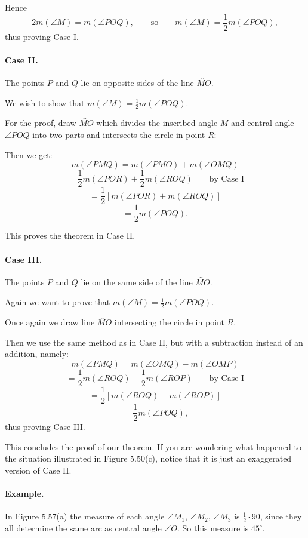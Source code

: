 \documentclass[12pt]{book} %
\begin{document}
Hence
\[
2m(\angle M)=m(\angle POQ), \qquad \text{so} \qquad m(\angle M)=\frac12 m(\angle POQ),
\]
thus proving Case I.

\paragraph{Case II.}
The points $P$ and $Q$ lie on opposite sides of the line $\overleftrightarrow{MO}$.


We wish to show that $m(\angle M)=\frac12 m(\angle POQ)$.

For the proof, draw $\overleftrightarrow{MO}$ which divides the inscribed angle $M$ and
central angle $\angle POQ$ into two parts and intersects the circle in point $R$:


Then we get:
\[
m(\angle PMQ)=m(\angle PMO)+m(\angle OMQ)
\]
\[
=\frac12 m(\angle POR)+\frac12 m(\angle ROQ)
\qquad \text{by Case I}
\]
\[
=\frac12[m(\angle POR)+m(\angle ROQ)]
\]
\[
=\frac12 m(\angle POQ).
\]

This proves the theorem in Case II.

\paragraph{Case III.}
The points $P$ and $Q$ lie on the same side of the line $\overleftrightarrow{MO}$.


Again we want to prove that $m(\angle M)=\frac12 m(\angle POQ)$.

Once again we draw line $\overleftrightarrow{MO}$ intersecting the circle in point $R$.


Then we use the same method as in Case II, but with a subtraction instead of an addition, namely:
\[
m(\angle PMQ)=m(\angle OMQ)-m(\angle OMP)
\]
\[
=\frac12 m(\angle ROQ)-\frac12 m(\angle ROP)
\qquad \text{by Case I}
\]
\[
=\frac12[m(\angle ROQ)-m(\angle ROP)]
\]
\[
=\frac12 m(\angle POQ),
\]
thus proving Case III.

This concludes the proof of our theorem. If you are wondering what happened to the situation illustrated in Figure 5.50(c), notice that it is just an exaggerated version of Case II.

\paragraph{Example.}
In Figure 5.57(a) the measure of each angle $\angle M_1$, $\angle M_2$,
$\angle M_3$ is $\frac12\cdot 90$, since they all determine the same arc as central angle $\angle O$.
So this measure is $45^\circ$.
\end{document}
